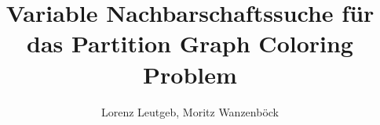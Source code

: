 \documentclass[paper=a4,fontsize=12pt]{scrartcl}
\title{Variable Nachbarschaftssuche für das Partition Graph Coloring Problem}
\author{Lorenz Leutgeb, Moritz Wanzenböck}
\begin{document}
	\maketitle
	\newpage
	\tableofcontents
	\newpage
	
	
	
%	
	
	\newpage
	\listoffigures
	\lstlistoflistings
\end{document}
